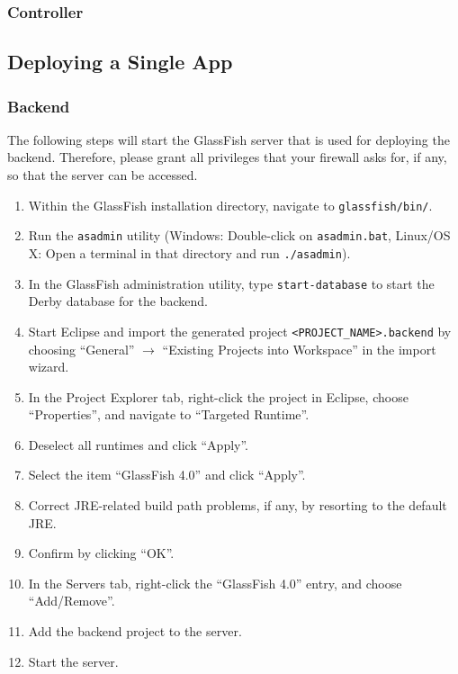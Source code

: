 \subsubsection{Controller} 
\label{subsubsec:Controller}



\subsection{Deploying a Single App}
\label{subsec:SingleAppDep}

\subsubsection{Backend} 
\label{subsubsec:Backend}

	The following steps will start the GlassFish server that is used for deploying the backend.
	Therefore, please grant all privileges that your firewall asks for, if any, so that the server can be accessed.

\begin{enumerate}
\item Within the GlassFish installation directory, navigate to \lstinline[language=Simple]|glassfish/bin/|.
\item Run the \lstinline[language=Simple]|asadmin| utility (Windows: Double-click on \lstinline[language=Simple]|asadmin.bat|, Linux/OS X: Open a terminal in that directory and run \lstinline[language=Simple]|./asadmin|).
\item In the GlassFish administration utility, type \lstinline[language=Simple]|start-database| to start the Derby database for the backend.
\item Start Eclipse and import the generated project \lstinline[language=Simple]|<PROJECT_NAME>.backend| by choosing \enquote{General} $\rightarrow$ \enquote{Existing Projects into Workspace} in the import wizard.
\item In the Project Explorer tab, right-click the project in Eclipse, choose \enquote{Properties}, and navigate to \enquote{Targeted Runtime}.
\item Deselect all runtimes and click \enquote{Apply}.
\item Select the item \enquote{GlassFish 4.0} and click \enquote{Apply}.
\item Correct JRE-related build path problems, if any, by resorting to the default JRE.
\item Confirm by clicking \enquote{OK}.
\item In the Servers tab, right-click the \enquote{GlassFish 4.0} entry, and choose \enquote{Add/Remove}.
\item Add the backend project to the server.
\item Start the server.
\end{enumerate}


